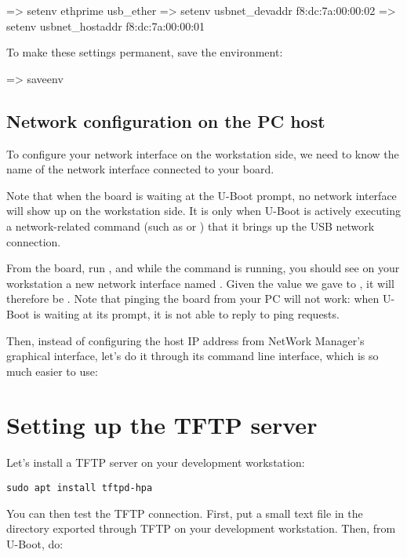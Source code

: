 \begin{ubootinput}
=> setenv ethprime usb_ether
=> setenv usbnet_devaddr f8:dc:7a:00:00:02
=> setenv usbnet_hostaddr f8:dc:7a:00:00:01
\end{ubootinput}

To make these settings permanent, save the environment:

\begin{ubootinput}
=> saveenv
\end{ubootinput}

\subsection{Network configuration on the PC host}

To configure your network interface on the workstation side, we need
to know the name of the network interface connected to your board.

Note that when the board is waiting at the U-Boot prompt, no network
interface will show up on the workstation side. It is only when U-Boot
is actively executing a network-related command (such as 
or ) that it brings up the USB network connection.

From the board, run , and while the 
command is running, you should see on your workstation a new network
interface named . Given the value we gave to
, it will therefore be
. Note that pinging the board from your PC will
not work: when U-Boot is waiting at its prompt, it is not able to
reply to ping requests.

Then, instead of configuring the host IP address from NetWork Manager's
graphical interface, let's do it through its command line interface,
which is so much easier to use:


\section{Setting up the TFTP server}

Let's install a TFTP server on your development workstation:

\begin{verbatim}
sudo apt install tftpd-hpa
\end{verbatim}

You can then test the TFTP connection. First, put a small text file in
the directory exported through TFTP on your development
workstation. Then, from U-Boot, do:

